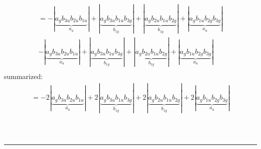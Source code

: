 \documentclass{article}
\begin{document}
\begin{multline*}
\end{multline*}\begin{multline*}
=-\left|\underbrace{a_{g} b_{3u} b_{2u} b_{1u}}_{a_{u}}\right|+\left|\underbrace{a_{g} b_{3u} b_{1u} b_{3g}}_{b_{1g}}\right|+\left|\underbrace{a_{g} b_{2u} b_{1u} b_{2g}}_{b_{1g}}\right|+\left|\underbrace{a_{g} b_{1u} b_{2g} b_{3g}}_{a_{u}}\right|\\
-\left|\underbrace{a_{g} b_{3u} b_{2u} b_{1u}}_{a_{u}}\right|+\left|\underbrace{a_{g} b_{3u} b_{1u} b_{3g}}_{b_{1g}}\right|+\left|\underbrace{a_{g} b_{2u} b_{1u} b_{2g}}_{b_{1g}}\right|+\left|\underbrace{a_{g} b_{1u} b_{2g} b_{3g}}_{a_{u}}\right|\\
\end{multline*}summarized:\begin{multline*}
=-2\left|\underbrace{a_{g} b_{3u} b_{2u} b_{1u}}_{a_{u}}\right|+2\left|\underbrace{a_{g} b_{3u} b_{1u} b_{3g}}_{b_{1g}}\right|+2\left|\underbrace{a_{g} b_{2u} b_{1u} b_{2g}}_{b_{1g}}\right|+2\left|\underbrace{a_{g} b_{1u} b_{2g} b_{3g}}_{a_{u}}\right|\\
\end{multline*}\\ \\
\hrule\newpage 
\end{document}
